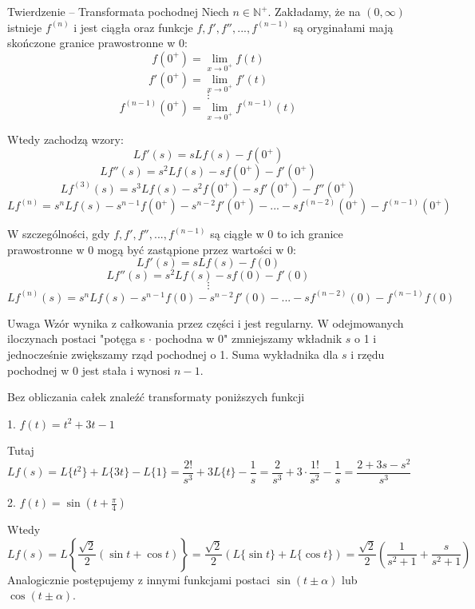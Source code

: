 \begin{tw}{Twierdzenie -- Transformata pochodnej}
    Niech $ n \in \mathbb{N}^+ $. Zakładamy, że na $ (0, \infty) $ istnieje $ f^{(n)} $ i jest ciągła oraz funkcje $ f, f', f'',..., f^{(n-1)} $ są 
    oryginałami mają skończone granice prawostronne w 0:
    \[ f(0^+) = \lim_{x \to 0^+} f(t) \]
    \[ f'(0^+) = \lim_{x \to 0^+} f'(t) \]
    \[ \vdots  \]
    \[ f^{(n - 1)} (0^+) = \lim_{x \to 0^+} f^{(n - 1)}(t) \]

    Wtedy zachodzą wzory: \medskip
    \[ Lf'(s) = sLf(s) - f(0^+) \]
    \[ Lf''(s) = s^2 Lf(s) - sf(0^+) - f'(0^+) \]
    \[ Lf^{(3)}(s) = s^3 Lf(s) - s^2 f(0^+) - sf'(0^+) - f''(0^+) \]
    \[ Lf^{(n)} = s^n Lf(s) - s^{n - 1} f(0^+) - s^{n - 2}f'(0^+) - ... - sf^{(n-2)}(0^+) - f^{(n-1)}(0^+) \]

    W szczególności, gdy $ f, f', f'', ..., f^{(n-1)} $ są ciągłe w 0 to ich granice prawostronne w 0 mogą być zastąpione przez wartości w 0:
    \[ Lf'(s) = sLf(s) - f(0) \]
    \[ Lf''(s) = s^2 Lf(s) - sf(0) - f'(0) \]
    \[ \vdots \]
    \[ Lf^{(n)}(s) = s^n Lf(s) - s^{n-1} f(0) - s^{n-2} f'(0) - ... - s f^{(n - 2)} (0) - f^{(n - 1)} f(0) \]
\end{tw}

\begin{blad}{Uwaga}
    Wzór wynika z całkowania przez części i jest regularny. W odejmowanych iloczynach postaci "potęga s $\cdot$ pochodna w 0" zmniejszamy wkładnik $s$ o 1
    i jednocześnie zwiększamy rząd pochodnej o 1. Suma wykładnika dla $s$ i rzędu pochodnej w 0 jest stała i wynosi $n - 1$.
\end{blad}

\bigskip

Bez obliczania całek znaleźć transformaty poniższych funkcji
\begin{przyklad}
    1. $ f(t) = t^2 + 3t - 1 $
    
    Tutaj
    \[ Lf(s) = L\{ t^2 \} + L\{3t\} - L\{1\} = \frac{2!}{s^3} + 3L\{ t \} - \frac{1}{s} = \frac{2}{s^3} + 3 \cdot \frac{1!}{s^2} - \frac{1}{s} = \frac{2 + 3s - s^2}{s^3} \]
\end{przyklad}

\begin{przyklad}
    2. $ f(t) = \sin \left( t + \frac{\pi}{4} \right) $

    Wtedy
    \[ Lf(s) = L \left\{ \frac{\sqrt{2}}{2}(\sin t + \cos t) \right\} = \frac{\sqrt{2}}{2}(L \{ \sin t \} + L \{ \cos t \}) = \frac{\sqrt{2}}{2} \left( \frac{1}{s^2 + 1} + \frac{s}{s^2 + 1} \right) \]
    Analogicznie postępujemy z innymi funkcjami postaci $ \sin (t \pm \alpha) $ lub $ \cos (t \pm \alpha) $. 
\end{przyklad}

